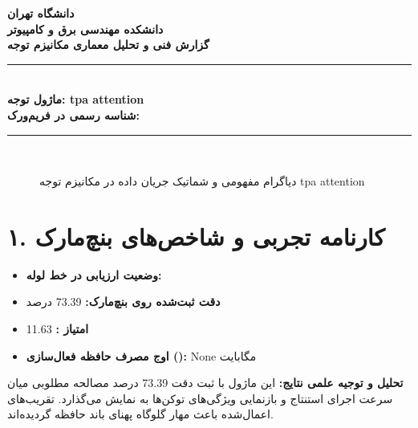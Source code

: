 \documentclass[12pt,a4paper]{article}
\begin{document}
\begin{center}
{\Large\bfseries دانشگاه تهران}\\[0.2cm]
{\large\bfseries دانشکده مهندسی برق و کامپیوتر}\\[0.2cm]
{\large\bfseries گزارش فنی و تحلیل معماری مکانیزم توجه}\\[0.5cm]
\rule{\linewidth}{1pt}\\[0.3cm]
{\LARGE\bfseries ماژول توجه: tpa attention}\\[0.2cm]
{\large \textbf{شناسه رسمی در فریم‌ورک:} }\\[0.2cm]
\rule{\linewidth}{1pt}\\[0.5cm]
\end{center}

\begin{figure}[H]
\centering
{}
\caption{دیاگرام مفهومی و شماتیک جریان داده در مکانیزم توجه tpa attention}
\end{figure}

\section*{۱. کارنامه تجربی و شاخص‌های بنچ‌مارک}
\begin{itemize}
\item \textbf{وضعیت ارزیابی در خط لوله:} 
\item \textbf{دقت ثبت‌شده روی بنچ‌مارک:} 73.39 درصد
\item \textbf{امتیاز :} 11.63
\item \textbf{اوج مصرف حافظه فعال‌سازی ():} None مگابایت
\end{itemize}
\textbf{تحلیل و توجیه علمی نتایج:} این ماژول با ثبت دقت 73.39 درصد مصالحه مطلوبی میان سرعت اجرای استنتاج و بازنمایی ویژگی‌های توکن‌ها به نمایش می‌گذارد. تقریب‌های اعمال‌شده باعث مهار گلوگاه پهنای باند حافظه گردیده‌اند.
\end{document}
